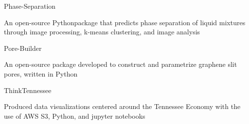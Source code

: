 
\begin{cventries}
  \cventry
    {} %
    {Phase-Separation} %
    {} %
    {} %
    {
      \begin{cvitems} %
        \item {An open-source Pythonpackage that predicts phase separation of liquid
            mixtures through image processing,
              k-means clustering, and image
              analysis}
      \end{cvitems}
    }

  \cventry
    {} %
    {Pore-Builder} %
    {} %
    {} %
    {
      \begin{cvitems} %
      	\item {An open-source package developed to construct and parametrize
            graphene slit pores, written in Python}
      \end{cvitems}
    }

  \cventry
    {} %
    {ThinkTennessee} %
    {} %
    {} %
    {
      \begin{cvitems} %
        \item {Produced data visualizations centered around the Tennessee Economy with the use of AWS S3, Python, and jupyter notebooks}
      \end{cvitems}
    }

\end{cventries}
